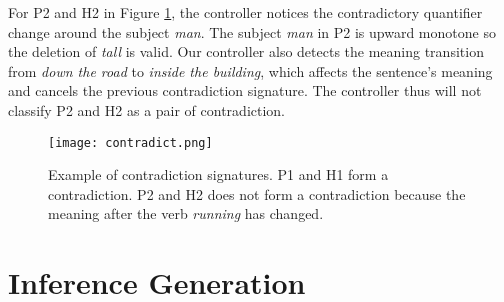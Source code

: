 \documentclass[11pt,a4paper]{article}
\begin{document}
\begin{table}[t]
\centering
{}
\vspace{-2mm}
\caption{\label{font-table} Examples of contradiction signatures.}
\vspace{-6mm}
\end{table}
For P2 and H2 in Figure \ref{fig:contradict}, the controller notices the contradictory quantifier change around the subject \textit{man}. The subject \textit{man} in P2 is upward monotone so the deletion of \textit{tall} is valid. Our controller also detects the meaning transition from \textit{down the road} to \textit{inside the building}, which affects the sentence's meaning and cancels the previous contradiction signature. The controller thus will not classify P2 and H2 as a pair of contradiction. 
\begin{figure}[h!]
    \centering
    \texttt{[image: contradict.png]}
    \caption{Example of contradiction signatures. P1 and H1 form a contradiction. P2 and H2 does not form a contradiction because the meaning after the verb \textit{running} has changed.}
    \label{fig:contradict}
\end{figure}


\section{Inference Generation}
\end{document}

